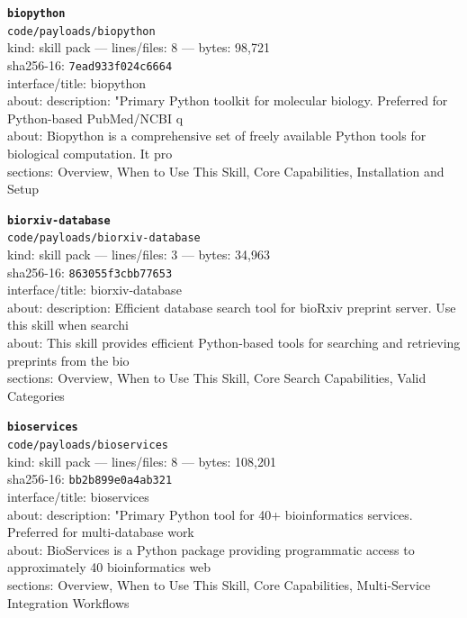 \noindent\textbf{\texttt{biopython}}\\
\texttt{code/payloads/biopython}\\
kind: skill pack --- lines/files: 8 --- bytes: 98,721\\
sha256-16: \texttt{7ead933f024c6664}\\
interface/title: biopython\\
about: description: "Primary Python toolkit for molecular biology. Preferred for Python-based PubMed/NCBI q\\
about: Biopython is a comprehensive set of freely available Python tools for biological computation. It pro\\
sections: Overview, When to Use This Skill, Core Capabilities, Installation and Setup\\
\vspace*{6.0pt}

\noindent\textbf{\texttt{biorxiv-database}}\\
\texttt{code/payloads/biorxiv-database}\\
kind: skill pack --- lines/files: 3 --- bytes: 34,963\\
sha256-16: \texttt{863055f3cbb77653}\\
interface/title: biorxiv-database\\
about: description: Efficient database search tool for bioRxiv preprint server. Use this skill when searchi\\
about: This skill provides efficient Python-based tools for searching and retrieving preprints from the bio\\
sections: Overview, When to Use This Skill, Core Search Capabilities, Valid Categories\\
\vspace*{6.0pt}

\noindent\textbf{\texttt{bioservices}}\\
\texttt{code/payloads/bioservices}\\
kind: skill pack --- lines/files: 8 --- bytes: 108,201\\
sha256-16: \texttt{bb2b899e0a4ab321}\\
interface/title: bioservices\\
about: description: "Primary Python tool for 40+ bioinformatics services. Preferred for multi-database work\\
about: BioServices is a Python package providing programmatic access to approximately 40 bioinformatics web\\
sections: Overview, When to Use This Skill, Core Capabilities, Multi-Service Integration Workflows\\
\vspace*{6.0pt}

